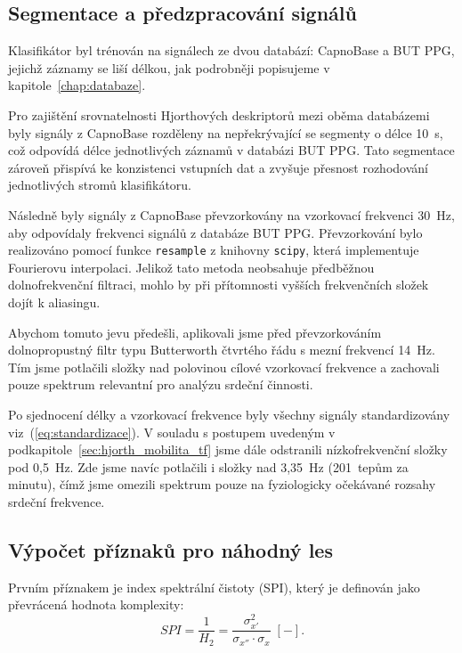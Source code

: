 \subsection*{Segmentace a předzpracování signálů}
\label{subsec:segmentace_predzpracovani}
Klasifikátor byl trénován na signálech ze dvou databází: CapnoBase a \acs{BUT PPG}, jejichž záznamy se liší délkou, jak podrobněji popisujeme v kapitole~\ref{chap:databaze}.

Pro zajištění srovnatelnosti Hjorthových deskriptorů mezi oběma databázemi byly signály z CapnoBase rozděleny na nepřekrývající se segmenty o délce 10~s, což odpovídá délce jednotlivých záznamů v databázi \acs{BUT PPG}.
Tato segmentace zároveň přispívá ke konzistenci vstupních dat a zvyšuje přesnost rozhodování jednotlivých stromů klasifikátoru.

Následně byly signály z CapnoBase převzorkovány na vzorkovací frekvenci 30~Hz, aby odpovídaly frekvenci signálů z databáze \acs{BUT PPG}.
Převzorkování bylo realizováno pomocí funkce \texttt{resample} z knihovny \texttt{scipy}, která implementuje Fourierovu interpolaci.
Jelikož tato metoda neobsahuje předběžnou dolnofrekvenční filtraci, mohlo by při přítomnosti vyšších frekvenčních složek dojít k aliasingu.

Abychom tomuto jevu předešli, aplikovali jsme před převzorkováním dolnopropustný filtr typu Butterworth čtvrtého řádu s mezní frekvencí 14~Hz.
Tím jsme potlačili složky nad polovinou cílové vzorkovací frekvence a zachovali pouze spektrum relevantní pro analýzu srdeční činnosti.

Po sjednocení délky a vzorkovací frekvence byly všechny signály standardizovány viz~(\ref{eq:standardizace}).
V souladu s postupem uvedeným v podkapitole~\ref{sec:hjorth_mobilita_tf} jsme dále odstranili nízkofrekvenční složky pod 0,5~Hz.
Zde jsme navíc potlačili i složky nad 3,35~Hz (201~tepům za minutu), čímž jsme omezili spektrum pouze na fyziologicky očekávané rozsahy srdeční frekvence.

\subsection*{Výpočet příznaků pro náhodný les}
\label{subsec:rf_features}
Prvním příznakem je index spektrální čistoty (\acs{SPI}), který je definován jako převrácená hodnota komplexity:
\begin{equation}
	\label{eq:hjorth_SPI}
	SPI = \frac{1}{H_2} = \frac{\sigma_{x'}^2}{\sigma_{x''} \cdot \sigma_{x}} \; [-].
\end{equation}

